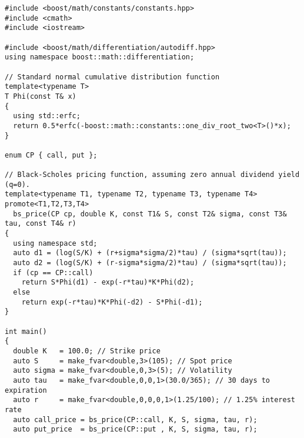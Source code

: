 \documentclass{article}
\begin{document}
\begingroup
\fontsize{10pt}{10pt}\selectfont
\begin{verbatim}
#include <boost/math/constants/constants.hpp>
#include <cmath>
#include <iostream>

#include <boost/math/differentiation/autodiff.hpp>
using namespace boost::math::differentiation;

// Standard normal cumulative distribution function
template<typename T>
T Phi(const T& x)
{
  using std::erfc;
  return 0.5*erfc(-boost::math::constants::one_div_root_two<T>()*x);
}

enum CP { call, put };

// Black-Scholes pricing function, assuming zero annual dividend yield (q=0).
template<typename T1, typename T2, typename T3, typename T4>
promote<T1,T2,T3,T4>
  bs_price(CP cp, double K, const T1& S, const T2& sigma, const T3& tau, const T4& r)
{
  using namespace std;
  auto d1 = (log(S/K) + (r+sigma*sigma/2)*tau) / (sigma*sqrt(tau));
  auto d2 = (log(S/K) + (r-sigma*sigma/2)*tau) / (sigma*sqrt(tau));
  if (cp == CP::call)
    return S*Phi(d1) - exp(-r*tau)*K*Phi(d2);
  else
    return exp(-r*tau)*K*Phi(-d2) - S*Phi(-d1);
}

int main()
{
  double K   = 100.0; // Strike price
  auto S     = make_fvar<double,3>(105); // Spot price
  auto sigma = make_fvar<double,0,3>(5); // Volatility
  auto tau   = make_fvar<double,0,0,1>(30.0/365); // 30 days to expiration
  auto r     = make_fvar<double,0,0,0,1>(1.25/100); // 1.25% interest rate
  auto call_price = bs_price(CP::call, K, S, sigma, tau, r);
  auto put_price  = bs_price(CP::put , K, S, sigma, tau, r);


\end{verbatim}
\end{document}
